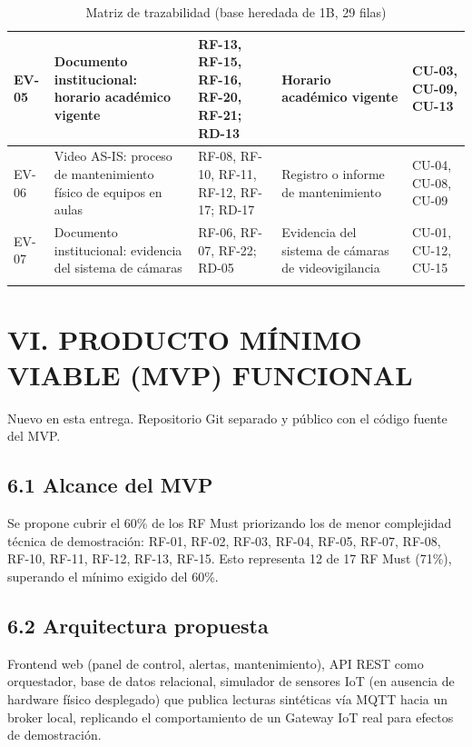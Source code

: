 \begin{longtable}{|P{0.2000}|P{0.2000}|P{0.2000}|P{0.2000}|P{0.2000}|}
EV-05 & Documento institucional: horario académico vigente & RF-13, RF-15, RF-16, RF-20, RF-21; RD-13 & Horario académico vigente & CU-03, CU-09, CU-13 \\ \hline
EV-06 & Video AS-IS: proceso de mantenimiento físico de equipos en aulas & RF-08, RF-10, RF-11, RF-12, RF-17; RD-17 & Registro o informe de mantenimiento & CU-04, CU-08, CU-09 \\ \hline
EV-07 & Documento institucional: evidencia del sistema de cámaras & RF-06, RF-07, RF-22; RD-05 & Evidencia del sistema de cámaras de videovigilancia & CU-01, CU-12, CU-15 \\ \hline
\caption{Matriz de trazabilidad (base heredada de 1B, 29 filas)}
\end{longtable}
\endgroup

\section*{VI. PRODUCTO MÍNIMO VIABLE (MVP) FUNCIONAL}


Nuevo en esta entrega. Repositorio Git separado y público con el código fuente del MVP.


\subsection*{6.1 Alcance del MVP}


Se propone cubrir el 60\% de los RF Must priorizando los de menor complejidad técnica de demostración: RF-01, RF-02, RF-03, RF-04, RF-05, RF-07, RF-08, RF-10, RF-11, RF-12, RF-13, RF-15. Esto representa 12 de 17 RF Must (71\%), superando el mínimo exigido del 60\%.


\subsection*{6.2 Arquitectura propuesta}


Frontend web (panel de control, alertas, mantenimiento), API REST como orquestador, base de datos relacional, simulador de sensores IoT (en ausencia de hardware físico desplegado) que publica lecturas sintéticas vía MQTT hacia un broker local, replicando el comportamiento de un Gateway IoT real para efectos de demostración.


